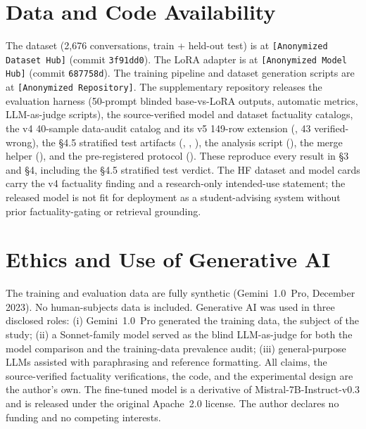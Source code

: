 \documentclass[11pt]{article}
\begin{document}
\section*{Data and Code Availability}
\begin{sloppypar}
The dataset (2,676 conversations, train + held-out test) is at \texttt{[Anonymized Dataset Hub]} (commit \texttt{3f91dd0}). The LoRA adapter is at \texttt{[Anonymized Model Hub]} (commit \texttt{687758d}). The training pipeline and dataset generation scripts are at \texttt{[Anonymized Repository]}. The supplementary repository releases the evaluation harness (50-prompt blinded base-vs-LoRA outputs, automatic metrics, LLM-as-judge scripts), the source-verified model and dataset factuality catalogs, the v4 40-sample data-audit catalog and its v5 149-row extension (, 43 verified-wrong), the §4.5 stratified test artifacts (, , ), the analysis script (), the merge helper (), and the pre-registered protocol (). These reproduce every result in \S3 and \S4, including the §4.5 stratified test verdict. The HF dataset and model cards carry the v4 factuality finding and a research-only intended-use statement; the released model is not fit for deployment as a student-advising system without prior factuality-gating or retrieval grounding.
\end{sloppypar}

\section*{Ethics and Use of Generative AI}
The training and evaluation data are fully synthetic (Gemini~1.0~Pro, December 2023). No human-subjects data is included. Generative AI was used in three disclosed roles: (i) Gemini~1.0~Pro generated the training data, the subject of the study; (ii) a Sonnet-family model served as the blind LLM-as-judge for both the model comparison and the training-data prevalence audit; (iii) general-purpose LLMs assisted with paraphrasing and reference formatting. All claims, the source-verified factuality verifications, the code, and the experimental design are the author's own. The fine-tuned model is a derivative of Mistral-7B-Instruct-v0.3 and is released under the original Apache~2.0 license. The author declares no funding and no competing interests.
\end{document}
